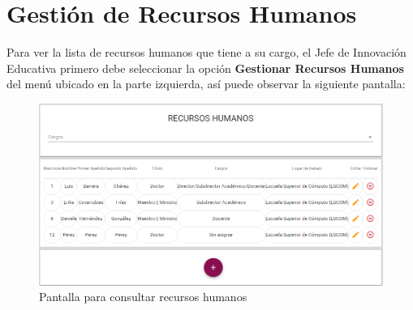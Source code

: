 
\section{Gestión de Recursos Humanos}
    Para ver la lista de recursos humanos que tiene a su cargo, el Jefe de Innovación Educativa primero debe seleccionar la opción \textbf{Gestionar Recursos Humanos} del menú ubicado en la parte izquierda, así puede observar la siguiente pantalla:

        \begin{figure}[H]
            \centering
            \hypertarget{consultarRH}{\includegraphics[width=0.7\linewidth]{images/SP1/ConsultarRH}}
            \caption{Pantalla para consultar recursos humanos}
            \label{consultarrh}
        \end{figure}

